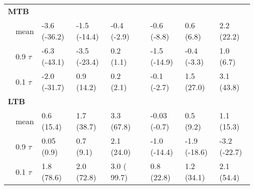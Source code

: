 \documentclass{svjour3}\usepackage[]{graphicx}\usepackage[]{color}
\begin{document}
\begin{table}[!tbp]
\begin{center}
\begin{tabular}{llllclll}
\hline
{\bfseries MTB}&&&&&&&\tabularnewline
~~mean&-3.6 {\footnotesize (-36.2)}&-1.5 {\footnotesize (-14.4)}&-0.4 {\footnotesize (-2.9)}&&-0.6 {\footnotesize (-8.8)}&0.6 {\footnotesize (6.8)}&2.2 {\footnotesize (22.2)}\tabularnewline
~~0.9 $\tau$&-6.3 {\footnotesize (-43.1)}&-3.5 {\footnotesize (-23.4)}&0.2 {\footnotesize (1.1)}&&-1.5 {\footnotesize (-14.9)}&-0.4 {\footnotesize (-3.3)}&1.0 {\footnotesize (6.7)}\tabularnewline
~~0.1 $\tau$&-2.0 {\footnotesize (-31.7)}&0.9 {\footnotesize (14.2)}&0.2 {\footnotesize (2.1)}&&-0.1 {\footnotesize (-2.7)}&1.5 {\footnotesize (27.0)}&3.1 {\footnotesize (43.8)}\tabularnewline
\hline
{\bfseries LTB}&&&&&&&\tabularnewline
~~mean&0.6 {\footnotesize (15.4)}&1.7 {\footnotesize (38.7)}&3.3 {\footnotesize (67.8)}&&-0.03 {\footnotesize (-0.7)}&0.5 {\footnotesize (9.2)}&1.1 {\footnotesize (15.3)}\tabularnewline
~~0.9 $\tau$&0.05 {\footnotesize (0.9)}&0.7 {\footnotesize (9.1)}&2.1 {\footnotesize (24.0)}&&-1.0 {\footnotesize (-14.4)}&-1.9 {\footnotesize (-18.6)}&-3.2 {\footnotesize (-22.7)}\tabularnewline
~~0.1 $\tau$&1.8 {\footnotesize (78.6)}&2.0 {\footnotesize (72.8)}&3.0 {\footnotesize ( 99.7)}&&0.8 {\footnotesize (22.8)}&1.2 {\footnotesize (34.1)}&2.1 {\footnotesize (54.4)}\tabularnewline
\hline
\end{tabular}
\end{center}
\end{table}
\end{document}
